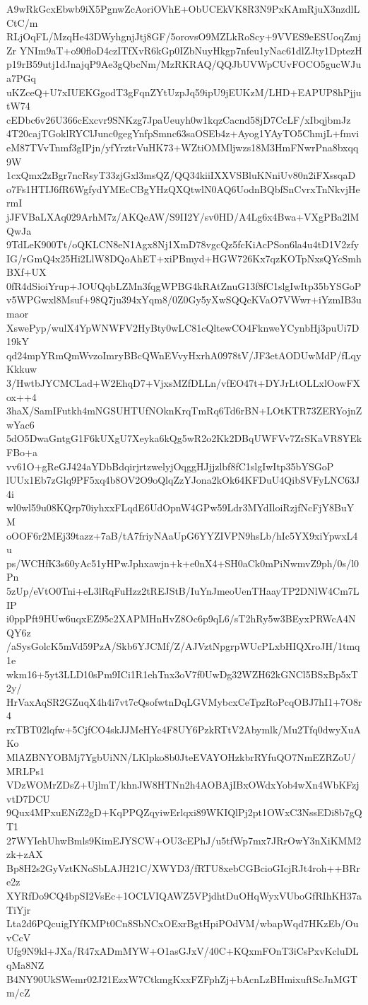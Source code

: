 A9wRkGcxEbwb9iX5PgnwZcAoriOVhE+ObUCEkVK8R3N9PxKAmRjuX3nzdlLCtC/m
RLjOqFL/MzqHe43DWyhgnjJtj8GF/5orovsO9MZLkRoScy+9VVES9eESUoqZmjZr
YNIm9aT+o90floD4czITfXvR6kGp0IZbNuyHkgp7nfeu1yNac61dlZJty1DptezH
p19rB59utj1dJnajqP9Ae3gQbcNm/MzRKRAQ/QQJbUVWpCUvFOCO5gucWJua7PGq
uKZceQ+U7xIUEKGgodT3gFqnZYtUzpJq59ipU9jEUKzM/LHD+EAPUP8hPjjutW74
cEDbc6v26U366cExcvr9SNKzg7JpaUeuyh0w1kqzCacnd58jD7CcLF/xIbqjbmJz
4T20cajTGoklRYClJunc0gegYnfpSmnc63saOSEb4z+Ayog1YAyTO5ChmjL+fmvi
eM87TVvTnmf3gIPjn/yfYrztrVuHK73+WZtiOMMljwzs18M3HmFNwrPna8bxqq9W
1cxQmx2zBgr7ncRsyT33zjGxl3msQZ/QQ34kiiIXXVSBluKNniUv80n2iFXssqaD
o7Fs1HTIJ6fR6WgfydYMEcCBgYHzQXQtwlN0AQ6UodnBQbfSnCvrxTnNkvjHermI
jJFVBaLXAq029ArhM7z/AKQeAW/S9II2Y/sv0HD/A4Lg6x4Bwa+VXgPBa2lMQwJa
9TdLeK900Tt/oQKLCN8eN1Agx8Nj1XmD78vgcQz5fcKiAcPSon6la4u4tD1V2zfy
IG/rGmQ4x25Hi2LlW8DQoAhET+xiPBmyd+HGW726Kx7qzKOTpNxsQYcSmhBXf+UX
0fR4dSioiYrup+JOUQqbLZMn3fqgWPBG4kRAtZnuG13f8fC1slgIwItp35bYSGoP
v5WPGwxl8Msuf+98Q7ju394xYqm8/0Z0Gy5yXwSQQcKVaO7VWwr+iYzmIB3umaor
XswePyp/wulX4YpWNWFV2HyBty0wLC81cQltewCO4FknweYCynbHj3puUi7D19kY
qd24mpYRmQmWvzoImryBBcQWnEVvyHxrhA0978tV/JF3etAODUwMdP/fLqyKkkuw
3/HwtbJYCMCLad+W2EhqD7+VjxsMZfDLLn/vfEO47t+DYJrLtOLLxlOowFXox++4
3haX/SamIFutkh4mNGSUHTUfNOknKrqTmRq6Td6rBN+LOtKTR73ZERYojnZwYac6
5dO5DwaGntgG1F6kUXgU7Xeyka6kQg5wR2o2Kk2DBqUWFVv7ZrSKaVR8YEkFBo+a
vv61O+gReGJ424aYDbBdqirjrtzwelyjOqggHJjjzlbf8fC1slgIwItp35bYSGoP
lUUx1Eb7zGlq9PF5xq4b8OV2O9oQlqZzYJona2kOk64KFDuU4QibSVFyLNC63J4i
wl0wl59u08KQrp70iyhxxFLqdE6UdOpnW4GPw59Ldr3MYdIloiRzjfNcFjY8BuYM
oOOF6r2MEj39tazz+7aB/tA7friyNAaUpG6YYZIVPN9hsLb/hIc5YX9xiYpwxL4u
ps/WCHfK3s60yAc51yHPwJphxawjn+k+e0nX4+SH0aCk0mPiNwmvZ9ph/0s/l0Pn
5zUp/eVtO0Tni+eL3lRqFuHzz2tREJStB/IuYnJmeoUenTHaayTP2DNlW4Cm7LIP
i0ppPft9HUw6uqxEZ95c2XAPMHnHvZ8Oc6p9qL6/sT2hRy5w3BEyxPRWcA4NQY6z
/aSysGolcK5mVd59PzA/Skb6YJCMf/Z/AJVztNpgrpWUcPLxbHIQXroJH/1tmq1e
wkm16+5yt3LLD10sPm9ICi1R1ehTnx3oV7f0UwDg32WZH62kGNCl5BSxBp5xT2y/
HrVaxAqSR2GZuqX4h4i7vt7cQsofwtnDqLGVMybcxCeTpzRoPcqOBJ7hI1+7O8r4
rxTBT02lqfw+5CjfCO4skJJMeHYc4F8UY6PzkRTtV2Abymlk/Mu2Tfq0dwyXuAKo
MlAZBNYOBMj7YgbUiNN/LKlpko8b0JteEVAYOHzkbrRYfuQO7NmEZRZoU/MRLPs1
VDzWOMrZDsZ+UjlmT/khnJW8HTNn2h4AOBAjIBxOWdxYob4wXn4WbKFzjvtD7DCU
9Qux4MPxuENiZ2gD+KqPPQZqyiwErlqxi89WKIQlPj2pt1OWxC3NssEDi8b7gQT1
27WYIehUhwBmls9KimEJYSCW+OU3cEPhJ/u5tfWp7mx7JRrOwY3nXiKMM2zk+zAX
Bp8H2s2GyVztKNoSbLAJH21C/XWYD3/fRTU8xebCGBcioGIcjRJt4roh++BRre2z
XYRfDo9CQ4bpSI2VsEc+1OCLVIQAWZ5VPjdhtDuOHqWyxVUboGfRIhKH37aTiYjr
Lta2d6PQcuigIYfKMPt0Cn8SbNCxOExrBgtHpiPOdVM/wbapWqd7HKzEb/OuvCcV
Ufg9N9kl+JXa/R47xADmMYW+O1asGJxV/40C+KQxmFOnT3iCsPxvKcluDLqMa8NZ
B4NY90UkSWemr02J21EzxW7CtkmgKxxFZFphZj+bAcnLzBHmixuftScJnMGTm/cZ
